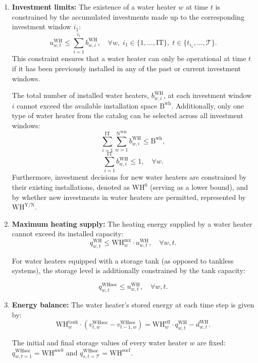 \documentclass[11pt]{article}
\begin{document}
\begin{enumerate}
    \item \textbf{Investment limits:}
    The existence of a water heater \(w\) at time \(t\) is constrained by the accumulated investments made up to the corresponding investment window \(i_1\):
    \[
    u^\text{WH}_{w,t} \leq \sum_{i=1}^{i_1} b^\text{WH}_{w,i}, \quad \forall w, \; i_1 \in \{1, \dots, \text{IT}\}, \; t \in \{t_{i_1}, \dots, \mathcal{T}\}.
    \]
    This constraint ensures that a water heater can only be operational at time \(t\) if it has been previously installed in any of the past or current investment windows.

    The total number of installed water heaters, \(b^\text{WH}_{w,i}\), at each investment window \(i\) cannot exceed the available installation space \(\text{B}^\text{wh}\). Additionally, only one type of water heater from the catalog can be selected across all investment windows:
    \[
    \sum_{i=1}^{\text{IT}} \sum_{w=1}^{\text{N}^\text{WH}} b^\text{WH}_{w,i} \leq \text{B}^\text{wh},
    \]
    \[
    \sum_{i=1}^{\text{IT}} b^\text{WH}_{w,i} \leq 1, \quad \forall w.
    \]
    Furthermore, investment decisions for new water heaters are constrained by their existing installations, denoted as \(\text{WH}^\text{0}\) (serving as a lower bound), and by whether new investments in water heaters are permitted, represented by \(\text{WH}^\text{Y/N}\).
        
    \item \textbf{Maximum heating supply:}
    The heating energy supplied by a water heater cannot exceed its installed capacity:
    \[
    q^\text{WH}_{w,t} \leq \text{WH}^\text{mx}_w \cdot u^\text{WH}_{w,t}, \quad \forall w,t.
    \]

    For water heaters equipped with a storage tank (as opposed to tankless systems), the storage level is additionally constrained by the tank capacity:
     
    \[
    q^\text{WHsoc}_{w,t} \leq u^\text{WH}_{w,t}, \quad \forall w,t.
    \]

    \item \textbf{Energy balance:}
    The water heater's stored energy at each time step is given by:
    \[
    \text{WH}^\text{tank}_w \cdot \left( v^\text{WHsoc}_{t,w} - v^\text{WHsoc}_{t-1,w} \right)=
    \text{WH}^\text{eff}_w \cdot q^\text{WH}_{w,t} - d^\text{WH}_{w,t}.
    \]

    The initial and final storage values of every water heater \(w\) are fixed: \(q^\text{WHsoc}_{w,t=1} = \text{WH}^\text{soc0}\) and \(q^\text{WHsoc}_{s,t=\mathcal{T}} = \text{WH}^\text{socf}\).


\end{enumerate}
\end{document}

